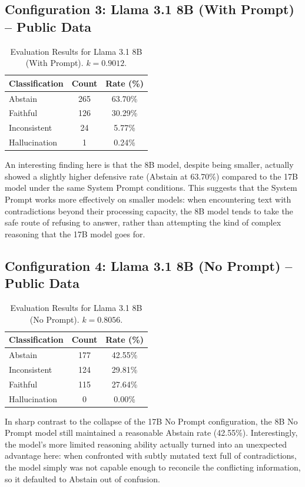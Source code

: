 \subsection{Configuration 3: Llama 3.1 8B (With Prompt) -- Public Data}
\begin{table}[H]
\centering
\caption{Evaluation Results for Llama 3.1 8B (With Prompt). $k = 0.9012$.}
\label{tab:8b_prompt}
\begin{tabular}{lcc}
\toprule
\textbf{Classification} & \textbf{Count} & \textbf{Rate (\%)} \\
\midrule
Abstain & 265 & 63.70\% \\
Faithful & 126 & 30.29\% \\
Inconsistent & 24 & 5.77\% \\
Hallucination & 1 & 0.24\% \\
\bottomrule
\end{tabular}
\end{table}
An interesting finding here is that the 8B model, despite being smaller, actually showed a slightly higher defensive rate (Abstain at 63.70\%) compared to the 17B model under the same System Prompt conditions. This suggests that the System Prompt works more effectively on smaller models: when encountering text with contradictions beyond their processing capacity, the 8B model tends to take the safe route of refusing to answer, rather than attempting the kind of complex reasoning that the 17B model goes for.

\subsection{Configuration 4: Llama 3.1 8B (No Prompt) -- Public Data}
\begin{table}[H]
\centering
\caption{Evaluation Results for Llama 3.1 8B (No Prompt). $k = 0.8056$.}
\label{tab:8b_noprompt}
\begin{tabular}{lcc}
\toprule
\textbf{Classification} & \textbf{Count} & \textbf{Rate (\%)} \\
\midrule
Abstain & 177 & 42.55\% \\
Inconsistent & 124 & 29.81\% \\
Faithful & 115 & 27.64\% \\
Hallucination & 0 & 0.00\% \\
\bottomrule
\end{tabular}
\end{table}
In sharp contrast to the collapse of the 17B No Prompt configuration, the 8B No Prompt model still maintained a reasonable Abstain rate (42.55\%). Interestingly, the model's more limited reasoning ability actually turned into an unexpected advantage here: when confronted with subtly mutated text full of contradictions, the model simply was not capable enough to reconcile the conflicting information, so it defaulted to Abstain out of confusion.

